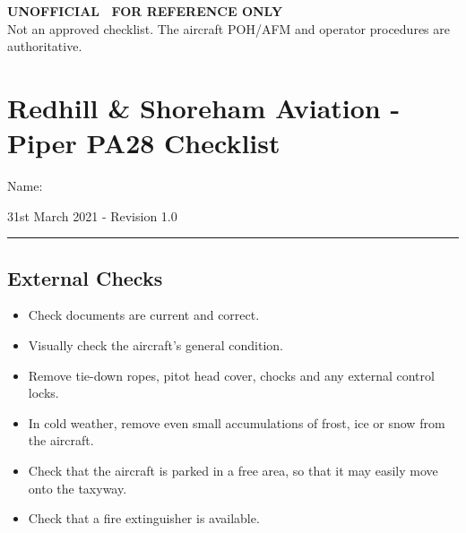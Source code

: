 \documentclass[a4paper]{article}
\newenvironment{checklist}{
  \begin{itemize}[leftmargin=*, align=left]
    \setlength{\itemsep}{2pt}
    \setlength{\parskip}{0pt}
    \setlength{\parsep}{0pt}
}{
  \end{itemize}
}
\begin{document}
\begin{center}{\color{red}\bfseries\large UNOFFICIAL \textendash\ FOR REFERENCE ONLY}\\[2pt]{\footnotesize Not an approved checklist. The aircraft POH/AFM and operator procedures are authoritative.}\end{center}
\section*{Redhill \& Shoreham Aviation - Piper PA28 Checklist}

Name: \makebox[5cm]{\hrulefill}

31st March 2021 - Revision 1.0

\rule{\linewidth}{0.4pt}

\subsection*{External Checks}
\begin{checklist}
\item Check documents are current and correct.
\item Visually check the aircraft’s general condition.
\item Remove tie-down ropes, pitot head cover, chocks and any external control locks.
\item In cold weather, remove even small accumulations of frost, ice or snow from the aircraft.
\item Check that the aircraft is parked in a free area, so that it may easily move onto the taxyway.
\item Check that a fire extinguisher is available.
\end{checklist}
\end{document}
